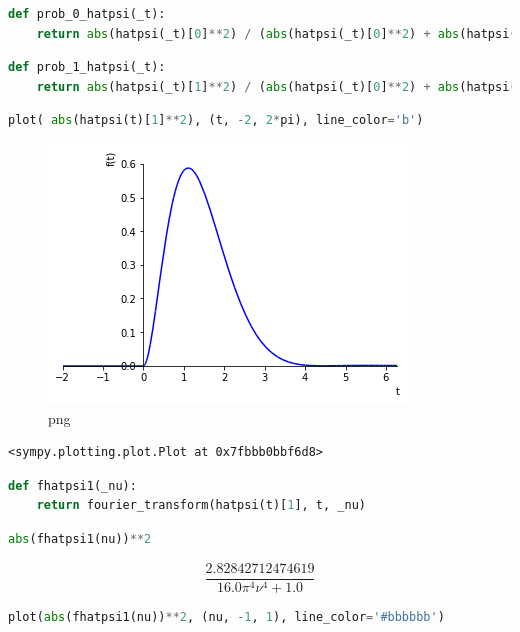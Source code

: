 \begin{lstlisting}[language=Python]
def prob_0_hatpsi(_t):
    return abs(hatpsi(_t)[0]**2) / (abs(hatpsi(_t)[0]**2) + abs(hatpsi(_t)[1]**2))
\end{lstlisting}

\begin{lstlisting}[language=Python]
def prob_1_hatpsi(_t):
    return abs(hatpsi(_t)[1]**2) / (abs(hatpsi(_t)[0]**2) + abs(hatpsi(_t)[1]**2))
\end{lstlisting}

\begin{lstlisting}[language=Python]
plot( abs(hatpsi(t)[1]**2), (t, -2, 2*pi), line_color='b')
\end{lstlisting}

\begin{figure}
\centering
\includegraphics[width=0.66\linewidth]{output_53_0.png}
\caption{png}
\end{figure}

\begin{lstlisting}
<sympy.plotting.plot.Plot at 0x7fbbb0bbf6d8>
\end{lstlisting}

\begin{lstlisting}[language=Python]
def fhatpsi1(_nu):
    return fourier_transform(hatpsi(t)[1], t, _nu)
\end{lstlisting}

\begin{lstlisting}[language=Python]
abs(fhatpsi1(nu))**2
\end{lstlisting}

\[\frac{2.82842712474619}{16.0 \pi^{4} \nu^{4} + 1.0}\]

\begin{lstlisting}[language=Python]
plot(abs(fhatpsi1(nu))**2, (nu, -1, 1), line_color='#bbbbbb')
\end{lstlisting}

